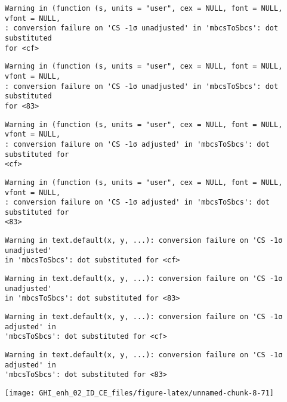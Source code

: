 \documentclass[
  10pt,
  a4paper,oneside]{article}
\begin{document}
\begin{verbatim}
Warning in (function (s, units = "user", cex = NULL, font = NULL, vfont = NULL,
: conversion failure on 'CS -1σ unadjusted' in 'mbcsToSbcs': dot substituted
for <cf>
\end{verbatim}

\begin{verbatim}
Warning in (function (s, units = "user", cex = NULL, font = NULL, vfont = NULL,
: conversion failure on 'CS -1σ unadjusted' in 'mbcsToSbcs': dot substituted
for <83>
\end{verbatim}

\begin{verbatim}
Warning in (function (s, units = "user", cex = NULL, font = NULL, vfont = NULL,
: conversion failure on 'CS -1σ adjusted' in 'mbcsToSbcs': dot substituted for
<cf>
\end{verbatim}

\begin{verbatim}
Warning in (function (s, units = "user", cex = NULL, font = NULL, vfont = NULL,
: conversion failure on 'CS -1σ adjusted' in 'mbcsToSbcs': dot substituted for
<83>
\end{verbatim}

\begin{verbatim}
Warning in text.default(x, y, ...): conversion failure on 'CS -1σ unadjusted'
in 'mbcsToSbcs': dot substituted for <cf>
\end{verbatim}

\begin{verbatim}
Warning in text.default(x, y, ...): conversion failure on 'CS -1σ unadjusted'
in 'mbcsToSbcs': dot substituted for <83>
\end{verbatim}

\begin{verbatim}
Warning in text.default(x, y, ...): conversion failure on 'CS -1σ adjusted' in
'mbcsToSbcs': dot substituted for <cf>
\end{verbatim}

\begin{verbatim}
Warning in text.default(x, y, ...): conversion failure on 'CS -1σ adjusted' in
'mbcsToSbcs': dot substituted for <83>
\end{verbatim}

\begin{center}\texttt{[image: GHI\_enh\_02\_ID\_CE\_files/figure-latex/unnamed-chunk-8-71]} \end{center}
\end{document}
